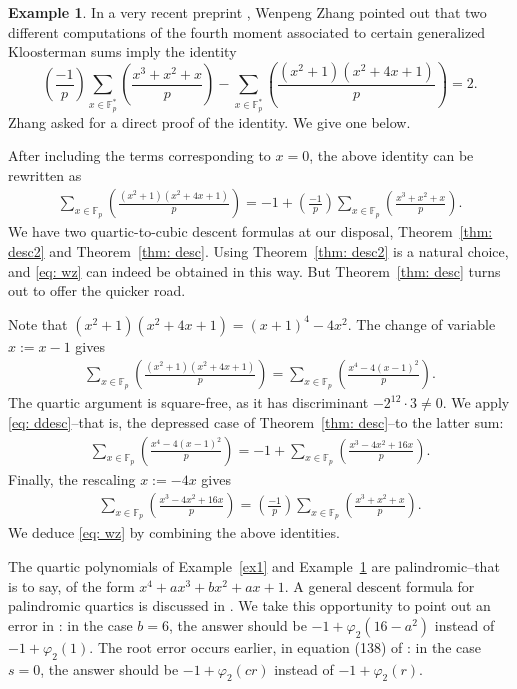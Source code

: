 \documentclass[11pt]{amsart}
\newcommand{\F}{\mathbb{F}}
\newcommand{\Fp}{\F_{\!p}}
\theoremstyle{definition}
\newtheorem{ex}{Example}[section]
\begin{document}
\begin{ex} \label{ex3}
In a very recent preprint \cite{Z}, Wenpeng Zhang pointed out that two different computations of the fourth moment associated to certain generalized Kloosterman sums imply the identity
\[
\left(\frac{-1}{p}\right)\sum_{x\in \Fp^*} \left(\frac{x^3+x^2+x}{p}\right)-\sum_{x\in \Fp^*} \left(\frac{(x^2+1)(x^2+4x+1)}{p}\right)=2.
\]
Zhang asked for a direct proof of the identity. We give one below. 

After including the terms corresponding to $x=0$, the above identity can be rewritten as 
\begin{align}\label{eq: wz}
\sum_{x\in \Fp} \left(\frac{(x^2+1)(x^2+4x+1)}{p}\right)=-1+\left(\frac{-1}{p}\right) \sum_{x\in \Fp} \left(\frac{x^3+x^2+x}{p}\right).
\end{align}
We have two quartic-to-cubic descent formulas at our disposal, Theorem~\ref{thm: desc2} and Theorem~\ref{thm: desc}. Using Theorem~\ref{thm: desc2} is a natural choice, and \eqref{eq: wz} can indeed be obtained in this way. But Theorem~\ref{thm: desc} turns out to offer the quicker road. 

Note that $(x^2+1)(x^2+4x+1)=(x+1)^4-4x^2$. The change of variable $x:=x-1$ gives
\begin{align*}
\sum_{x\in \Fp}\left(\frac{(x^2+1)(x^2+4x+1)}{p}\right)= \sum_{x\in \Fp}\left(\frac{x^4-4(x-1)^2}{p}\right).
\end{align*}
The quartic argument is square-free, as it has discriminant $-2^{12}\cdot 3\neq 0$. We apply \eqref{eq: ddesc}--that is, the depressed case of Theorem~\ref{thm: desc}--to the latter sum:
\begin{align*}
\sum_{x\in \Fp} \left(\frac{x^4-4(x-1)^2}{p}\right)=-1+\sum_{x\in \Fp} \left(\frac{x^3-4x^2+16x}{p}\right).
\end{align*}
Finally, the rescaling $x:=-4x$ gives
\begin{align*}
\sum_{x\in \Fp} \left(\frac{x^3-4x^2+16x}{p}\right)= \left(\frac{-1}{p}\right)\sum_{x\in \Fp} \left(\frac{x^3+x^2+x}{p}\right).
\end{align*}
We deduce \eqref{eq: wz} by combining the above identities.
\end{ex}

The quartic polynomials of Example~\ref{ex1} and Example~\ref{ex3} are palindromic--that is to say, of the form $x^4+ax^3+bx^2+ax+1$. A general descent formula for palindromic quartics is discussed in \cite[Ex.5.18]{N}. We take this opportunity to point out an error in \cite[Ex.5.18]{N}: in the case $b=6$, the answer should be $-1+\varphi_2(16-a^2)$ instead of $-1+\varphi_2(1)$. The root error occurs earlier, in equation (138) of \cite[Thm.5.16]{N}: in the case $s=0$, the answer should be $-1+\varphi_2(cr)$ instead of $-1+\varphi_2(r)$.
\end{document}
